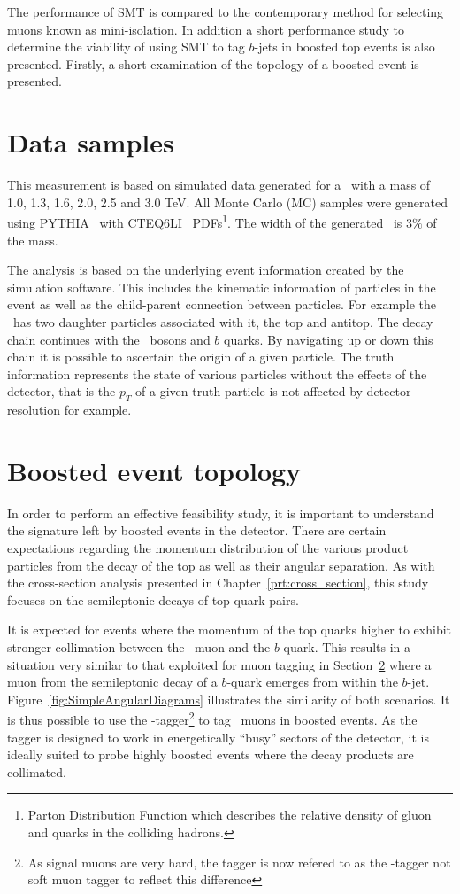 The performance of SMT is compared to the contemporary method for selecting muons known as mini-isolation. In addition a short performance study to determine the viability of using SMT to tag $b$-jets in boosted top events is also presented. Firstly, a short examination of the topology of a boosted event is presented.

\section{Data samples}

This measurement is based on simulated data generated for a \Zprime\ with a mass of 1.0, 1.3, 1.6, 2.0, 2.5 and 3.0 TeV. All Monte Carlo (MC) samples were generated using PYTHIA~\cite{Sjostrand2006Pythia} with CTEQ6LI~\cite{Pumplin2002New} PDFs\footnote{Parton Distribution Function which describes the relative density of gluon and quarks in the colliding hadrons.}. The width of the generated \Zprime\ is $3\%$ of the mass.

The analysis is based on the underlying event information created by the simulation software. This includes the kinematic information of particles in the event as well as the child-parent connection between particles. For example the \Zprime\ has two daughter particles associated with it, the top and antitop. The decay chain continues with the \W\ bosons and $b$ quarks. By navigating up or down this chain it is possible to ascertain the origin of a given particle. The truth information represents the state of various particles without the effects of the detector, that is the $p_{T}$ of a given truth particle is not affected by detector resolution for example.

\section{Boosted event topology}

In order to perform an effective feasibility study, it is important to understand the signature left by boosted events in the detector. There are certain expectations regarding the momentum distribution of the various product particles from the decay of the top as well as their angular separation. As with the cross-section analysis presented in Chapter~\ref{prt:cross_section}, this study focuses on the semileptonic decays of top quark pairs.

It is expected for events where the momentum of the top quarks higher to exhibit stronger collimation between the \W\ muon and the $b$-quark. This results in a situation very similar to that exploited for muon tagging in Section~\ref{} where a muon from the semileptonic decay of a $b$-quark emerges from within the $b$-jet. Figure~\ref{fig:SimpleAngularDiagrams} illustrates the similarity of both scenarios. It is thus possible to use the \xsm-tagger\footnote{As signal muons are very hard, the tagger is now refered to as the \xsm-tagger not soft muon tagger to reflect this difference} to tag \W\ muons in boosted events. As the tagger is designed to work in energetically ``busy'' sectors of the detector, it is ideally suited to probe highly boosted events where the decay products are collimated.

